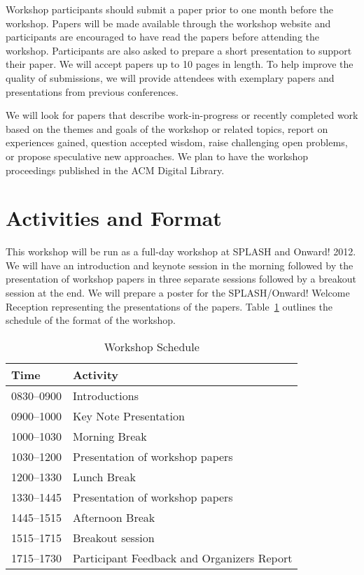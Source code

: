 \documentclass{sigplanconf}
\begin{document}
Workshop participants should submit a paper prior to one
month before the workshop. Papers will be made available
through the workshop website and participants are encouraged to have
read the papers before attending the workshop. Participants
are also asked to prepare a short presentation to support their
paper. We will accept papers up to 10 pages in length.
To help improve the quality of submissions, 
we will provide attendees with exemplary papers and presentations
from previous conferences.

\vfill\eject

We will look for papers that describe work-in-progress or recently completed work based on the themes and goals of the workshop or related topics, report on experiences gained, question accepted wisdom, raise challenging open problems, or propose
speculative new approaches. We plan to have the workshop proceedings published in the ACM Digital Library.

\section{Activities and Format}

This workshop will be run as a full-day workshop at SPLASH and Onward! 2012.  We
will have an introduction and keynote session in the morning followed
by the presentation of workshop papers in three separate sessions followed by a breakout session at the end. We will prepare a poster for the SPLASH/Onward! Welcome Reception representing the presentations of the papers. Table~\ref{tab:schedule} outlines the schedule of the format of the workshop.


\begin{table} [!htbp] %
\begin{tabularx}{\columnwidth}{l|X}
\textbf{Time}   & \textbf{Activity} \\
\hline
0830--0900    & Introductions \vspace{1mm} \\
0900--1000    & Key Note Presentation \vspace{1mm} \\
1000--1030     & Morning Break~\vspace{1mm}\\
1030--1200   & Presentation of workshop papers \vspace{1mm}\\
1200--1330     & Lunch Break~\vspace{1mm}\\
1330--1445   & Presentation of workshop papers \vspace{1mm}\\
1445--1515    & Afternoon Break~\vspace{1mm}\\
1515--1715    & Breakout session \vspace{1mm}\\
1715--1730    & Participant Feedback and Organizers Report  \\
\end{tabularx}
\caption{Workshop Schedule}
\label{tab:schedule}
\end{table}
\end{document}
